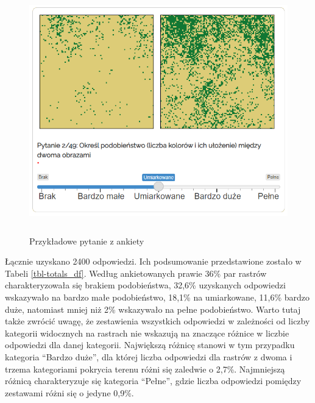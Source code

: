 \documentclass{amuthesis}
\begin{document}
\begin{figure}[t]

{\centering \includegraphics[width=5.10417in,height=4.16667in]{figures/przyklad_pytania.png}

}

\caption{\label{fig-przyklad_pytania}Przykładowe pytanie z ankiety}

\end{figure}

Łącznie uzyskano 2400 odpowiedzi. Ich podsumowanie przedstawione zostało
w Tabeli \ref{tbl-totals_df}. Według ankietowanych prawie 36\% par
rastrów charakteryzowała się brakiem podobieństwa, 32,6\% uzyskanych
odpowiedzi wskazywało na bardzo małe podobieństwo, 18,1\% na
umiarkowane, 11,6\% bardzo duże, natomiast mniej niż 2\% wskazywało na
pełne podobieństwo. Warto tutaj także zwrócić uwagę, że zestawienia
wszystkich odpowiedzi w zależności od liczby kategorii widocznych na
rastrach nie wskazują na znaczące różnice w liczbie odpowiedzi dla danej
kategorii. Największą różnicę stanowi w tym przypadku kategoria ``Bardzo
duże'', dla której liczba odpowiedzi dla rastrów z dwoma i trzema
kategoriami pokrycia terenu różni się zaledwie o 2,7\%. Najmniejszą
różnicą charakteryzuje się kategoria ``Pełne'', gdzie liczba odpowiedzi
pomiędzy zestawami różni się o jedyne 0,9\%.
\end{document}
